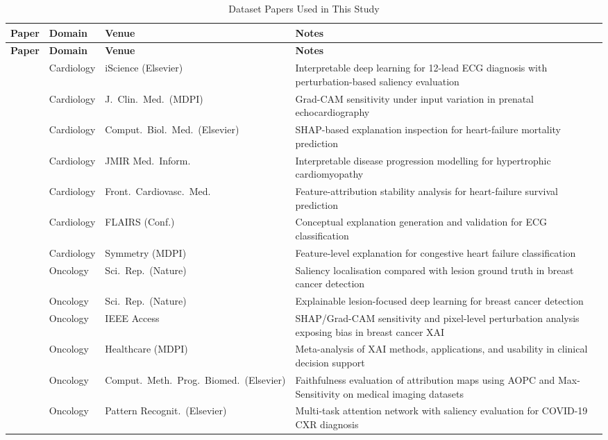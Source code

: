 \begin{longtable}{|p{3cm}|p{2.5cm}|p{3cm}|p{5.5cm}|}
\caption{Dataset Papers Used in This Study}
\label{tab:dataset_papers}\\
\hline
\textbf{Paper} & \textbf{Domain} & \textbf{Venue} & \textbf{Notes} \\
\hline
\endfirsthead

\hline
\textbf{Paper} & \textbf{Domain} & \textbf{Venue} & \textbf{Notes} \\
\hline
\endhead


\cite{Zhang2021} & Cardiology & iScience (Elsevier) & Interpretable deep learning for 12-lead ECG diagnosis with perturbation-based saliency evaluation \\
\hline
\cite{Nurmaini2022} & Cardiology & J.\ Clin.\ Med.\ (MDPI) & Grad-CAM sensitivity under input variation in prenatal echocardiography \\
\hline
\cite{Vazquez2021} & Cardiology & Comput.\ Biol.\ Med.\ (Elsevier) & SHAP-based explanation inspection for heart-failure mortality prediction \\
\hline
\cite{Piculin2022} & Cardiology & JMIR Med.\ Inform. & Interpretable disease progression modelling for hypertrophic cardiomyopathy \\
\hline
\cite{MorenoSanchez2023} & Cardiology & Front.\ Cardiovasc.\ Med. & Feature-attribution stability analysis for heart-failure survival prediction \\
\hline
\cite{Sangroya2022} & Cardiology & FLAIRS (Conf.) & Conceptual explanation generation and validation for ECG classification \\
\hline
\cite{Li2020} & Cardiology & Symmetry (MDPI) & Feature-level explanation for congestive heart failure classification \\
\hline


\cite{Pertuz2023} & Oncology & Sci.\ Rep.\ (Nature) & Saliency localisation compared with lesion ground truth in breast cancer detection \\
\hline
\cite{saharan2025explainable} & Oncology & Sci.\ Rep.\ (Nature) & Explainable lesion-focused deep learning for breast cancer detection \\
\hline
\cite{11271656} & Oncology & IEEE Access & SHAP/Grad-CAM sensitivity and pixel-level perturbation analysis exposing bias in breast cancer XAI \\
\hline
\cite{abbas2025explainable} & Oncology & Healthcare (MDPI) & Meta-analysis of XAI methods, applications, and usability in clinical decision support \\
\hline
\cite{Patricio2024} & Oncology & Comput.\ Meth.\ Prog.\ Biomed.\ (Elsevier) & Faithfulness evaluation of attribution maps using AOPC and Max-Sensitivity on medical imaging datasets \\
\hline
\cite{sharma2022covidmanet} & Oncology & Pattern Recognit.\ (Elsevier) & Multi-task attention network with saliency evaluation for COVID-19 CXR diagnosis \\
\hline


\end{longtable}
